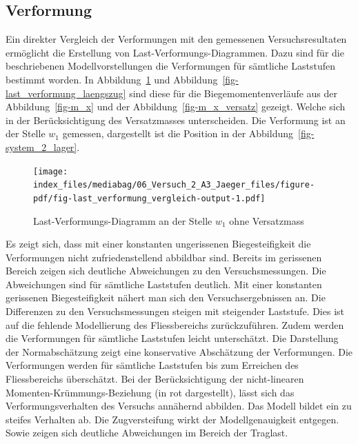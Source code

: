 \documentclass[
  12pt,
  letterpaper,
  egregdoesnotlikesansseriftitles]{scrreprt}
\begin{document}
\hypertarget{verformung}{%
\subsection{Verformung}\label{verformung}}

Ein direkter Vergleich der Verformungen mit den gemessenen
Versuchsresultaten ermöglicht die Erstellung von
Last-Verformungs-Diagrammen. Dazu sind für die beschriebenen
Modellvorstellungen die Verformungen für sämtliche Laststufen bestimmt
worden. In Abbildung~\ref{fig-last_verformung_vergleich} und
Abbildung~\ref{fig-last_verformung_laengszug} sind diese für die
Biegemomentenverläufe aus der Abbildung~\ref{fig-m_x} und der
Abbildung~\ref{fig-m_x_versatz} gezeigt. Welche sich in der
Berücksichtigung des Versatzmasses unterscheiden. Die Verformung ist an
der Stelle \(w_1\) gemessen, dargestellt ist die Position in der
Abbildung~\ref{fig-system_2_lager}.

\begin{figure}[H]

{\centering \texttt{[image: index\_files/mediabag/06\_Versuch\_2\_A3\_Jaeger\_files/figure-pdf/fig-last\_verformung\_vergleich-output-1.pdf]}

}

\caption{\label{fig-last_verformung_vergleich}Last-Verformungs-Diagramm
an der Stelle \(w_1\) ohne Versatzmass}

\end{figure}

Es zeigt sich, dass mit einer konstanten ungerissenen Biegesteifigkeit
die Verformungen nicht zufriedenstellend abbildbar sind. Bereits im
gerissenen Bereich zeigen sich deutliche Abweichungen zu den
Versuchsmessungen. Die Abweichungen sind für sämtliche Laststufen
deutlich. Mit einer konstanten gerissenen Biegesteifigkeit nähert man
sich den Versuchsergebnissen an. Die Differenzen zu den
Versuchsmessungen steigen mit steigender Laststufe. Dies ist auf die
fehlende Modellierung des Fliessbereichs zurückzuführen. Zudem werden
die Verformungen für sämtliche Laststufen leicht unterschätzt. Die
Darstellung der Normabschätzung zeigt eine konservative Abschätzung der
Verformungen. Die Verformungen werden für sämtliche Laststufen bis zum
Erreichen des Fliessbereichs überschätzt. Bei der Berücksichtigung der
nicht-linearen Momenten-Krümmungs-Beziehung (in rot dargestellt), lässt
sich das Verformungsverhalten des Versuchs annähernd abbilden. Das
Modell bildet ein zu steifes Verhalten ab. Die Zugversteifung wirkt der
Modellgenauigkeit entgegen. Sowie zeigen sich deutliche Abweichungen im
Bereich der Traglast.
\end{document}

